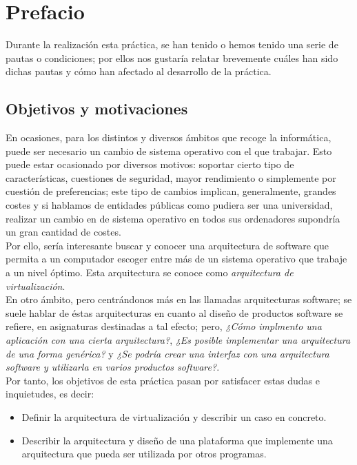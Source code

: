 \chapter*{Prefacio}

\lettrine[lines=1,slope=4pt,findent=0pt]{D}{}urante la realización esta práctica, se han tenido o hemos tenido una serie de pautas o condiciones; por ellos nos gustaría relatar brevemente cuáles han sido dichas pautas y cómo han afectado al desarrollo de la práctica.


\section*{Objetivos y motivaciones}
En ocasiones, para los distintos y diversos ámbitos que recoge la informática, puede ser necesario un cambio de sistema operativo con el que trabajar. Esto puede estar ocasionado por diversos motivos: soportar cierto tipo de características, cuestiones de seguridad, mayor rendimiento o simplemente por cuestión de preferencias; este tipo de cambios implican, generalmente, grandes costes y si hablamos de entidades públicas como pudiera ser una universidad, realizar un cambio en de sistema operativo en todos sus ordenadores supondría un gran cantidad de costes.\\

Por ello, sería interesante buscar y conocer una arquitectura de software que permita a un computador escoger entre más de un sistema operativo que trabaje a un nivel óptimo. Esta arquitectura se conoce como \emph{arquitectura de virtualización}.\\

En otro ámbito, pero centrándonos más en las llamadas arquitecturas software; se suele hablar de éstas arquitecturas en cuanto al diseño de productos software se refiere, en asignaturas destinadas a tal efecto; pero, \emph{¿Cómo implmento una aplicación con una cierta arquitectura?}, \emph{¿Es posible implementar una arquitectura de una forma genérica?} y \emph{¿Se podría crear una interfaz con una arquitectura software y utilizarla en varios productos software?}.\\

Por tanto, los objetivos de esta práctica pasan por satisfacer estas dudas e inquietudes, es decir:
\begin{itemize}
\item Definir la arquitectura de virtualización y describir un caso en concreto.
\item Describir la arquitectura y diseño de una plataforma que implemente una arquitectura que pueda ser utilizada por otros programas.
\end{itemize}

